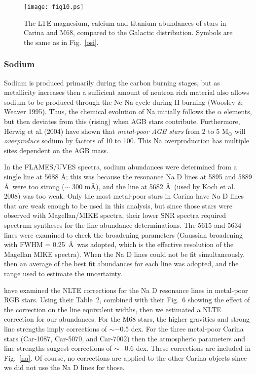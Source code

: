 \documentclass{emulateapj}
\newcommand\etal{{\rm et al.\,}}
\begin{document}
\begin{figure}[t]
\texttt{[image: fig10.ps]}
\caption{The LTE magnesium, calcium and titanium abundances
of stars in Carina and M68, compared to the Galactic distribution. 
Symbols are the same as in Fig.~\ref{osi}. \\
}
\label{mgcati}
\end{figure}



\subsubsection {Sodium \label{sodium}} 
Sodium is produced primarily during the carbon burning stages, but 
as metallicity increases then a sufficient amount of neutron rich material
also allows sodium to be produced through the Ne-Na cycle during H-burning
(Woosley \& Weaver 1995).   Thus, the chemical evolution of Na initially
follows the $\alpha$ elements, but then deviates from this (rising)
when AGB stars contribute.
%
Furthermore, Herwig \etal (2004) have shown that {\it metal-poor AGB stars} 
from 2 to 5 M$_\odot$ will {\it overproduce} sodium by factors of 10 to 100.    
This Na overproduction has multiple sites dependent on the AGB mass.

In the FLAMES/UVES spectra, sodium abundances were determined from a 
single  line at 5688 \AA; this was because the resonance 
Na D lines at 5895 and 5889 \AA\ were too strong ($\sim$ 300 m\AA), 
and the line at 5682 \AA\ (used by Koch \etal 2008) was too weak.  
Only the most metal-poor stars in Carina have Na D lines that are 
weak enough to be used in this analysis, but since those stars were 
observed with Magellan/MIKE spectra, their lower SNR spectra required
spectrum syntheses for the line abundance determinations.
The  5615 and 5634 lines were 
examined to check the broadening parameters 
(Gaussian broadening with FWHM = 0.25~\AA\ was adopted, which is
the effective resolution of the Magellan MIKE spectra).
When the Na D lines could not be fit simultaneously, then an average of
the best fit abundances for each line was adopted, 
and the range used to estimate 
the uncertainty.

\citep{And07} have examined the NLTE corrections for the 
Na D resonance lines in metal-poor RGB stars.   Using their Table~2,
combined with their Fig.~6 showing the effect of the correction on
the line equivalent widths, then we estimated a NLTE correction for 
our abundances.    For the M68 stars, the higher gravities and strong
line strengths imply corrections of $\sim -0.5$ dex.   For the three
metal-poor Carina stars (Car-1087, Car-5070, and Car-7002) then the
atmospheric parameters and line strengths suggest corrections of
$\sim -0.6$ dex.    These corrections
are included in Fig.~\ref{na}.    
%
Of course, no corrections are applied to the other Carina objects 
since we did not use the Na D lines for those.    
\end{document}
